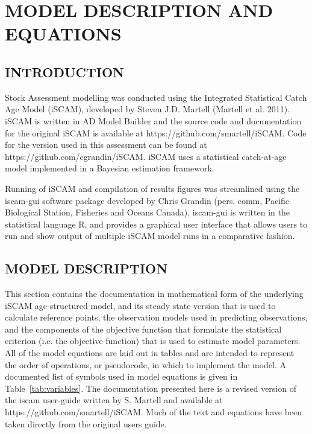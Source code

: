 
\def\beq{\vspace{-5ex} \begin{fleqn} \begin{equation}}
\def\eeq{\end{equation} \end{fleqn} \vspace{-5ex}}
\def\tabline{\vspace{2ex} \hrule \vspace{2ex}}
\def\newp{\vfill \break}

\clearpage

\chapter{MODEL DESCRIPTION AND EQUATIONS}

\section{INTRODUCTION}

Stock Assessment modelling was conducted using the Integrated Statistical Catch Age Model (iSCAM), developed by Steven J.D. Martell (Martell et al. 2011).  iSCAM is written in AD Model Builder and the source code and documentation for the original iSCAM is available at https://github.com/smartell/iSCAM. Code for the version used in this assessment can be found at https://github.com/cgrandin/iSCAM. iSCAM uses a statistical catch-at-age model implemented in a Bayesian estimation framework.

Running of iSCAM and compilation of results figures was streamlined using the iscam-gui software package developed by Chris Grandin (pers. comm, Pacific Biological Station, Fisheries and Oceans Canada). iscam-gui is written in the statistical language R, and provides a graphical user interface that allows users to run and show output of multiple iSCAM model runs in a comparative fashion.

\section{MODEL DESCRIPTION}

This section contains the documentation in mathematical form of the underlying iSCAM age-structured model, and its steady state version that is used to calculate reference points, the observation models used in predicting observations, and the components of the objective function that formulate the statistical criterion (i.e. the objective function) that is used to estimate model parameters. All of the model equations are laid out in tables and are intended to represent the order of operations, or pseudocode, in which to implement the model. A documented list of symbols used in model equations is given in Table~\ref{tab:variables}. The documentation presented here is a revised version of the iscam user-guide written by S. Martell and available at https://github.com/smartell/iSCAM. Much of the text and equations have been taken directly from the original users guide.

